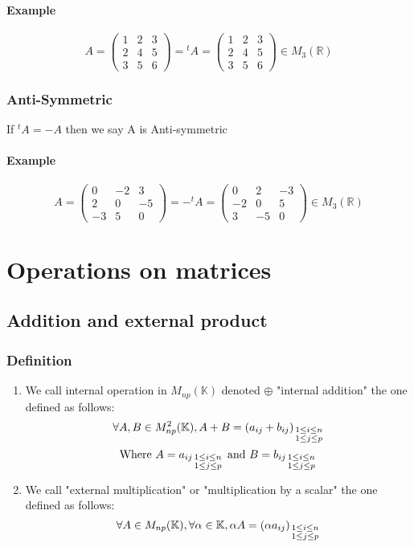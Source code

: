\documentclass[notitlepage]{math}
\begin{document}
        \paragraph{Example}
        \[ A = \begin{pmatrix}
            1 & 2 & 3 \\
            2 & 4 & 5 \\
            3 & 5 & 6
        \end{pmatrix} = {}^t \! A = 
        \begin{pmatrix}
            1 & 2 & 3 \\
            2 & 4 & 5 \\
            3 & 5 & 6
        \end{pmatrix}
            \in M_{3}(\mathbb{R})\]
    \subsubsection{Anti-Symmetric}
        If $ {}^t \! A = -A $ then we say A is Anti-symmetric
        \paragraph{Example}
        \[ A = \begin{pmatrix}
            0 & -2 & 3 \\
            2 & 0 & -5 \\
            -3 & 5 & 0
        \end{pmatrix} = -{}^t \! A = 
        \begin{pmatrix}
            0 & 2 & -3 \\
            -2 & 0 & 5 \\
            3 & -5 & 0
        \end{pmatrix}
            \in M_{3}(\mathbb{R})\]
\section{Operations on matrices}
\subsection{Addition and external product}
\subsubsection{Definition}
\begin{enumerate}
    \item We call internal operation in $M_{np}(\mathbb{K})$ denoted $\oplus$ "internal addition" the one defined as follows:
    \[ \forall A,B \in M^2_{np}(\mathbb{K}),  A + B = (a_{ij} + b_{ij})_{\begin{smallmatrix} 1 \leq i \leq n \\ 1 \leq j \leq p \end{smallmatrix}}\]
    \[ \text{Where } A = {a_{ij}}_{\begin{smallmatrix} 1 \leq i \leq n \\ 1 \leq j \leq p \end{smallmatrix}} \text{ and } B = {b_{ij}}_{\begin{smallmatrix} 1 \leq i \leq n \\ 1 \leq j \leq p \end{smallmatrix}}\]
    \item We call "external multiplication" or "multiplication by a scalar" the one defined as follows:
    \[ \forall A \in M_{np}(\mathbb{K}), \forall \alpha \in \mathbb{K}, \alpha A = (\alpha a_{ij})_{\begin{smallmatrix} 1 \leq i \leq n \\ 1 \leq j \leq p \end{smallmatrix}}\]
\end{enumerate}
\end{document}
